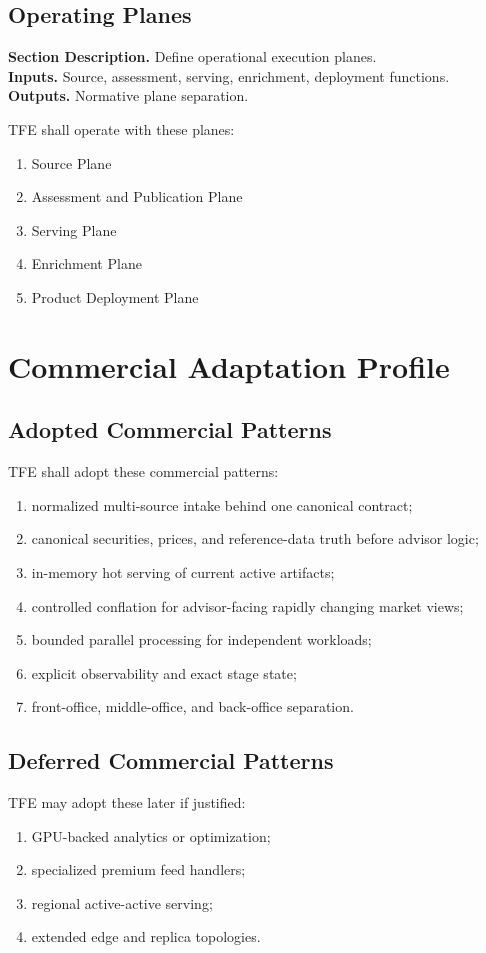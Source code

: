 \documentclass[11pt]{report}
\newcommand{\meta}[3]{\textbf{Section Description.} #1\\
\textbf{Inputs.} #2\\
\textbf{Outputs.} #3\par}
\begin{document}
\section{Operating Planes}
\meta{Define operational execution planes.}{Source, assessment, serving, enrichment, deployment functions.}{Normative plane separation.}

TFE shall operate with these planes:
\begin{enumerate}[leftmargin=1.2cm]
    \item Source Plane
    \item Assessment and Publication Plane
    \item Serving Plane
    \item Enrichment Plane
    \item Product Deployment Plane
\end{enumerate}
\chapter{Commercial Adaptation Profile}
\section{Adopted Commercial Patterns}
TFE shall adopt these commercial patterns:
\begin{enumerate}[leftmargin=1.2cm]
    \item normalized multi-source intake behind one canonical contract;
    \item canonical securities, prices, and reference-data truth before advisor logic;
    \item in-memory hot serving of current active artifacts;
    \item controlled conflation for advisor-facing rapidly changing market views;
    \item bounded parallel processing for independent workloads;
    \item explicit observability and exact stage state;
    \item front-office, middle-office, and back-office separation.
\end{enumerate}

\section{Deferred Commercial Patterns}
TFE may adopt these later if justified:
\begin{enumerate}[leftmargin=1.2cm]
    \item GPU-backed analytics or optimization;
    \item specialized premium feed handlers;
    \item regional active-active serving;
    \item extended edge and replica topologies.
\end{enumerate}
\end{document}
